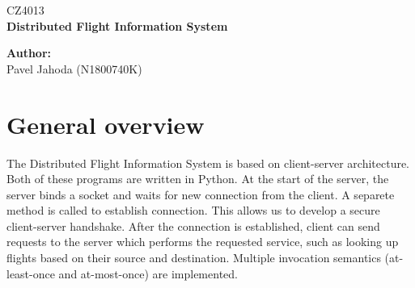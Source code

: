 \documentclass[12pt,a4paper]{article}
\begin{document}
\begin{titlepage}
  \thispagestyle{fancy}

  \vspace*{\fill}
  \begin{center}
    {\fontsize{20}{30}\selectfont CZ4013}\\[1cm]
    {\fontsize{30}{100}\selectfont \textbf{Distributed Flight Information System}}\\[4.2cm]
  \end{center}

  \vspace*{\fill}

  {\fontsize{10}{10} \selectfont \noindent
  \textbf{Author:}\\
  Pavel Jahoda (N1800740K)
  }
\end{titlepage}

\renewcommand{\headrulewidth}{0.4pt}
\renewcommand{\footrulewidth}{0.4pt}


\tableofcontents

\newpage


\section{General overview}
The Distributed Flight Information System is based on client-server architecture. Both of these programs are written in Python. At the start of the server, the server binds a socket and waits for new connection from the client. A separete method is called to establish connection. This allows us to develop a secure client-server handshake. After the connection is established, client can send requests to the server which performs the requested service, such as looking up flights based on their source and destination. Multiple invocation semantics (at-least-once and at-most-once) are implemented.
\end{document}

